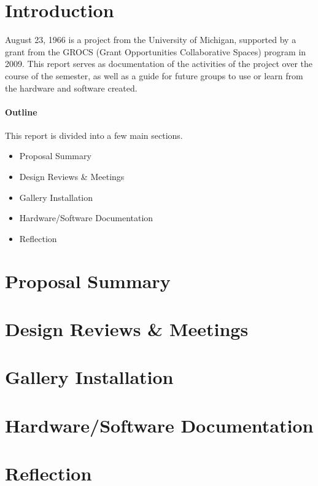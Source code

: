 \documentclass[10pt]{article}
\begin{document}
\maketitle

\section{Introduction}
August 23, 1966 is a project from the University of Michigan, supported by a
grant from the GROCS (Grant Opportunities Collaborative Spaces) program in 2009.
This report serves as documentation of the activities of the project over the
course of the semester, as well as a guide for future groups to use or learn
from the hardware and software created.

\paragraph{Outline}
This report is divided into a few main sections.
\begin{itemize}
    \item Proposal Summary
    \item Design Reviews \& Meetings
    \item Gallery Installation
    \item Hardware/Software Documentation
    \item Reflection
\end{itemize}

\section{Proposal Summary}

\section{Design Reviews \& Meetings}

\section{Gallery Installation}

\section{Hardware/Software Documentation}

\section{Reflection}
\end{document}
